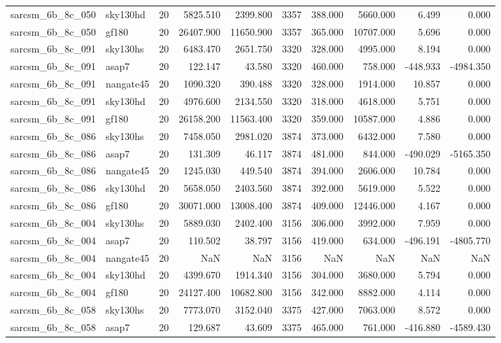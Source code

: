 \begin{longtable}{llrrrrrrrr}
sarcsm\_6b\_8c\_050 & sky130hd & 20 & 5825.510 & 2399.800 & 3357 & 388.000 & 5660.000 & 6.499 & 0.000 \\
sarcsm\_6b\_8c\_050 & gf180 & 20 & 26407.900 & 11650.900 & 3357 & 365.000 & 10707.000 & 5.696 & 0.000 \\
sarcsm\_6b\_8c\_091 & sky130hs & 20 & 6483.470 & 2651.750 & 3320 & 328.000 & 4995.000 & 8.194 & 0.000 \\
sarcsm\_6b\_8c\_091 & asap7 & 20 & 122.147 & 43.580 & 3320 & 460.000 & 758.000 & -448.933 & -4984.350 \\
sarcsm\_6b\_8c\_091 & nangate45 & 20 & 1090.320 & 390.488 & 3320 & 328.000 & 1914.000 & 10.857 & 0.000 \\
sarcsm\_6b\_8c\_091 & sky130hd & 20 & 4976.600 & 2134.550 & 3320 & 318.000 & 4618.000 & 5.751 & 0.000 \\
sarcsm\_6b\_8c\_091 & gf180 & 20 & 26158.200 & 11563.400 & 3320 & 359.000 & 10587.000 & 4.886 & 0.000 \\
sarcsm\_6b\_8c\_086 & sky130hs & 20 & 7458.050 & 2981.020 & 3874 & 373.000 & 6432.000 & 7.580 & 0.000 \\
sarcsm\_6b\_8c\_086 & asap7 & 20 & 131.309 & 46.117 & 3874 & 481.000 & 844.000 & -490.029 & -5165.350 \\
sarcsm\_6b\_8c\_086 & nangate45 & 20 & 1245.030 & 449.540 & 3874 & 394.000 & 2606.000 & 10.784 & 0.000 \\
sarcsm\_6b\_8c\_086 & sky130hd & 20 & 5658.050 & 2403.560 & 3874 & 392.000 & 5619.000 & 5.522 & 0.000 \\
sarcsm\_6b\_8c\_086 & gf180 & 20 & 30071.000 & 13008.400 & 3874 & 409.000 & 12446.000 & 4.167 & 0.000 \\
sarcsm\_6b\_8c\_004 & sky130hs & 20 & 5889.030 & 2402.400 & 3156 & 306.000 & 3992.000 & 7.959 & 0.000 \\
sarcsm\_6b\_8c\_004 & asap7 & 20 & 110.502 & 38.797 & 3156 & 419.000 & 634.000 & -496.191 & -4805.770 \\
sarcsm\_6b\_8c\_004 & nangate45 & 20 & NaN & NaN & 3156 & NaN & NaN & NaN & NaN \\
sarcsm\_6b\_8c\_004 & sky130hd & 20 & 4399.670 & 1914.340 & 3156 & 304.000 & 3680.000 & 5.794 & 0.000 \\
sarcsm\_6b\_8c\_004 & gf180 & 20 & 24127.400 & 10682.800 & 3156 & 342.000 & 8882.000 & 4.114 & 0.000 \\
sarcsm\_6b\_8c\_058 & sky130hs & 20 & 7773.070 & 3152.040 & 3375 & 427.000 & 7063.000 & 8.572 & 0.000 \\
sarcsm\_6b\_8c\_058 & asap7 & 20 & 129.687 & 43.609 & 3375 & 465.000 & 761.000 & -416.880 & -4589.430 \\

\end{longtable}
